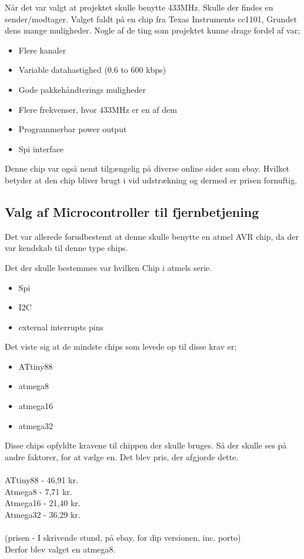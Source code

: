 \documentclass[Main]{subfiles}
\begin{document}
Når det var valgt at projektet skulle benytte 433MHz. Skulle der findes en sender/modtager.
Valget faldt på en chip fra Texas Instruments cc1101, Grundet dens mange muligheder.
Nogle af de ting som projektet kunne drage fordel af var;

\begin{itemize}
\item Flere kanaler
\item Variable datahastighed (0.6 to 600 kbps)
\item Gode pakkehåndterings muligheder 
\item Flere frekvenser, hvor 433MHz er en af dem
\item Programmerbar power output
\item Spi interface
\end{itemize}

Denne chip var også nemt tilgængelig på diverse online sider som ebay. Hvilket betyder at den chip bliver brugt i vid udstrækning og dermed er prisen fornuftig.
\\
\subsection{Valg af Microcontroller til fjernbetjening}

Det var allerede forudbestemt at denne skulle benytte en atmel AVR chip, da der var kendskab til denne type chips.

Det der skulle bestemmes var hvilken Chip i atmels serie.

\begin{itemize}
\item Spi
\item I2C
\item external interrupts pins
\end{itemize}

Det viste sig at de mindste chips som levede op til disse krav er;

\begin{itemize}
\item ATtiny88
\item atmega8
\item atmega16
\item atmega32
\end{itemize}


Disse chips opfyldte kravene til chippen der skulle bruges.
Så der skulle ses på andre faktorer, for at vælge en. 
Det blev pris, der afgjorde dette.\\\\
ATtiny88 - 46,91 kr.\\
Atmega8  - 7,71 kr.\\
Atmega16 - 21,40 kr.\\
Atmega32 - 36,29 kr.\\
\\(prisen - I skrivende stund, på ebay, for dip versionen, inc. porto)
\\Derfor blev valget en atmega8.
\end{document}
